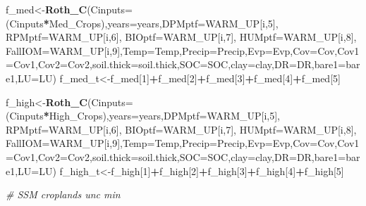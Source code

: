 \documentclass[
  10pt,
  b5paper,
]{book}
\newenvironment{Shaded}{\begin{snugshade}}{\end{snugshade}}
\newcommand{\CommentTok}[1]{\textcolor[rgb]{0.56,0.35,0.01}{\textit{#1}}}
\newcommand{\DataTypeTok}[1]{\textcolor[rgb]{0.13,0.29,0.53}{#1}}
\newcommand{\DecValTok}[1]{\textcolor[rgb]{0.00,0.00,0.81}{#1}}
\newcommand{\KeywordTok}[1]{\textcolor[rgb]{0.13,0.29,0.53}{\textbf{#1}}}
\newcommand{\NormalTok}[1]{#1}
\newcommand{\OperatorTok}[1]{\textcolor[rgb]{0.81,0.36,0.00}{\textbf{#1}}}
\begin{document}
\begin{Shaded}
\begin{Highlighting}[]
{\NormalTok{f_med<-}\KeywordTok{Roth_C}\NormalTok{(}\DataTypeTok{Cinputs=}\NormalTok{(Cinputs}\OperatorTok{*}\NormalTok{Med_Crops),}\DataTypeTok{years=}\NormalTok{years,}\DataTypeTok{DPMptf=}\NormalTok{WARM_UP[i,}\DecValTok{5}\NormalTok{], }\DataTypeTok{RPMptf=}\NormalTok{WARM_UP[i,}\DecValTok{6}\NormalTok{], }\DataTypeTok{BIOptf=}\NormalTok{WARM_UP[i,}\DecValTok{7}\NormalTok{], }\DataTypeTok{HUMptf=}\NormalTok{WARM_UP[i,}\DecValTok{8}\NormalTok{], }\DataTypeTok{FallIOM=}\NormalTok{WARM_UP[i,}\DecValTok{9}\NormalTok{],}\DataTypeTok{Temp=}\NormalTok{Temp,}\DataTypeTok{Precip=}\NormalTok{Precip,}\DataTypeTok{Evp=}\NormalTok{Evp,}\DataTypeTok{Cov=}\NormalTok{Cov,}\DataTypeTok{Cov1=}\NormalTok{Cov1,}\DataTypeTok{Cov2=}\NormalTok{Cov2,}\DataTypeTok{soil.thick=}\NormalTok{soil.thick,}\DataTypeTok{SOC=}\NormalTok{SOC,}\DataTypeTok{clay=}\NormalTok{clay,}\DataTypeTok{DR=}\NormalTok{DR,}\DataTypeTok{bare1=}\NormalTok{bare1,}\DataTypeTok{LU=}\NormalTok{LU)}
\NormalTok{f_med_t<-f_med[}\DecValTok{1}\NormalTok{]}\OperatorTok{+}\NormalTok{f_med[}\DecValTok{2}\NormalTok{]}\OperatorTok{+}\NormalTok{f_med[}\DecValTok{3}\NormalTok{]}\OperatorTok{+}\NormalTok{f_med[}\DecValTok{4}\NormalTok{]}\OperatorTok{+}\NormalTok{f_med[}\DecValTok{5}\NormalTok{]}

\NormalTok{f_high<-}\KeywordTok{Roth_C}\NormalTok{(}\DataTypeTok{Cinputs=}\NormalTok{(Cinputs}\OperatorTok{*}\NormalTok{High_Crops),}\DataTypeTok{years=}\NormalTok{years,}\DataTypeTok{DPMptf=}\NormalTok{WARM_UP[i,}\DecValTok{5}\NormalTok{], }\DataTypeTok{RPMptf=}\NormalTok{WARM_UP[i,}\DecValTok{6}\NormalTok{], }\DataTypeTok{BIOptf=}\NormalTok{WARM_UP[i,}\DecValTok{7}\NormalTok{], }\DataTypeTok{HUMptf=}\NormalTok{WARM_UP[i,}\DecValTok{8}\NormalTok{], }\DataTypeTok{FallIOM=}\NormalTok{WARM_UP[i,}\DecValTok{9}\NormalTok{],}\DataTypeTok{Temp=}\NormalTok{Temp,}\DataTypeTok{Precip=}\NormalTok{Precip,}\DataTypeTok{Evp=}\NormalTok{Evp,}\DataTypeTok{Cov=}\NormalTok{Cov,}\DataTypeTok{Cov1=}\NormalTok{Cov1,}\DataTypeTok{Cov2=}\NormalTok{Cov2,}\DataTypeTok{soil.thick=}\NormalTok{soil.thick,}\DataTypeTok{SOC=}\NormalTok{SOC,}\DataTypeTok{clay=}\NormalTok{clay,}\DataTypeTok{DR=}\NormalTok{DR,}\DataTypeTok{bare1=}\NormalTok{bare1,}\DataTypeTok{LU=}\NormalTok{LU)}
\NormalTok{f_high_t<-f_high[}\DecValTok{1}\NormalTok{]}\OperatorTok{+}\NormalTok{f_high[}\DecValTok{2}\NormalTok{]}\OperatorTok{+}\NormalTok{f_high[}\DecValTok{3}\NormalTok{]}\OperatorTok{+}\NormalTok{f_high[}\DecValTok{4}\NormalTok{]}\OperatorTok{+}\NormalTok{f_high[}\DecValTok{5}\NormalTok{]}

\CommentTok{# SSM croplands unc min}

}
\end{Highlighting}
\end{Shaded}
\end{document}
